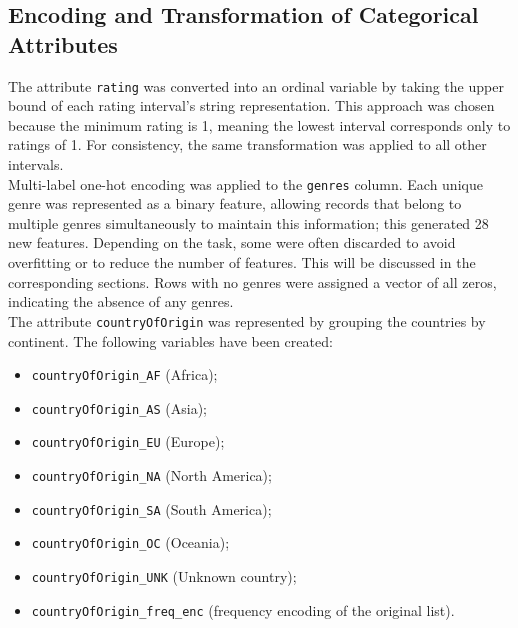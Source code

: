 \subsection{Encoding and Transformation of Categorical Attributes}
The attribute \texttt{rating} was converted into an ordinal variable by taking the upper bound of each rating
interval's string representation. This approach was chosen because the minimum rating is 1, meaning the
lowest interval corresponds only to ratings of 1. For consistency, the same transformation was applied
to all other intervals.\\

Multi-label one-hot encoding was applied to the \texttt{genres} column. 
Each unique genre was represented as a binary feature, allowing records that belong to multiple genres simultaneously to maintain this information; this generated 28 new features.
Depending on the task, some were often discarded to avoid overfitting or to reduce the number of features.
This will be discussed in the corresponding sections.
Rows with no genres were assigned a vector of all zeros, indicating the absence of any genres.\\

The attribute \texttt{countryOfOrigin} was represented by grouping the countries by continent.
The following variables have been created: 
\begin{multicols}{2}
    \begin{itemize}
        \item \texttt{countryOfOrigin\_AF} (Africa);
        \item \texttt{countryOfOrigin\_AS} (Asia);
        \item \texttt{countryOfOrigin\_EU} (Europe);
        \item \texttt{countryOfOrigin\_NA} (North America);
        \item \texttt{countryOfOrigin\_SA} (South America);
        \item \texttt{countryOfOrigin\_OC} (Oceania);
        \item \texttt{countryOfOrigin\_UNK} (Unknown country);
        \item \texttt{countryOfOrigin\_freq\_enc} (frequency encoding of the original list).
    \end{itemize}
\end{multicols}

